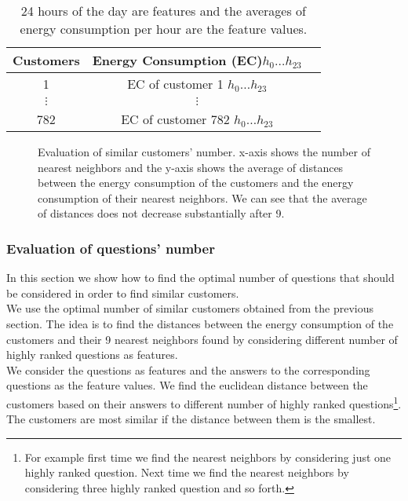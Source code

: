 \documentclass{sig-alternate-10pt}
\begin{document}
\begin{table}
\centering
\caption{24 hours of the day are features and the averages of energy consumption per hour are the feature values.}
\begin{tabular}{|c|c|l|} \hline
Customers&Energy Consumption (EC)$h_0 \ldots h_{23}$\\ \hline
1 & EC of customer 1 $h_0 \ldots h_{23}$ \\ \hline
$\vdots$ & $\vdots$\\ \hline
782 & EC of customer 782 $h_0 \ldots h_{23}$\\ \hline
\end{tabular}
\end{table}

\begin{figure}
\centering
{}
\caption{Evaluation of similar customers' number. x-axis shows the number of nearest neighbors and the y-axis shows the average of distances between the energy consumption of the customers and the energy consumption of their nearest neighbors. We can see that the average of distances does not decrease substantially after 9.}
\end{figure}


\subsubsection{Evaluation of questions' number}

In this section we show how to find the optimal number of questions that should be considered in order to find similar customers.\\

We use the optimal number of similar customers obtained from the previous section. The idea is to find the distances between the energy consumption of the customers and their 9 nearest neighbors found by considering different number of highly ranked questions as features.\\

We consider the questions  as features and the answers to the corresponding questions as the feature values. We find the euclidean distance between the customers based on their answers to different number of highly ranked questions\footnote {For example first time we find the nearest neighbors by considering just one highly ranked question. Next time we find the nearest neighbors by considering three highly ranked question and so forth.}. The customers are most similar if the distance between them is the smallest.\\
\end{document}
